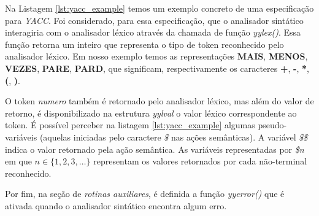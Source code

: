 Na Listagem \ref{lst:yacc_example} temos um exemplo concreto de uma
especificação para \emph{YACC}. Foi considerado, para essa especificação, que
o analisador sintático interagiria com o analisador léxico através da chamada
de função \emph{yylex()}. Essa função retorna um inteiro que representa o tipo
de token reconhecido pelo analisador léxico. Em nosso exemplo temos as
representações \textbf{MAIS}, \textbf{MENOS}, \textbf{VEZES}, \textbf{PARE},
\textbf{PARD}, que significam, respectivamente os caracteres \textbf{+},
\textbf{-}, \textbf{*}, \textbf{(}, \textbf{)}.

O token \emph{numero} também é retornado pelo analisador léxico, mas além do
valor de retorno, é disponibilizado na estrutura \emph{yylval} o valor léxico
correspondente ao token. É possível perceber na listagem \ref{lst:yacc_example}
algumas pseudo-variáveis (aquelas iniciadas pelo caractere \emph{\$} nas ações
semânticas). A variável \emph{\$\$} indica o valor retornado pela ação
semântica. As variáveis representadas por \emph{\$n} em que $n \in \{1, 2, 3,
\dotsc\}$ representam os valores retornados por cada não-terminal reconhecido.

Por fim, na seção de \emph{rotinas auxiliares}, é definida a função
\emph{yyerror()} que é ativada quando o analisador sintático encontra algum
erro.
